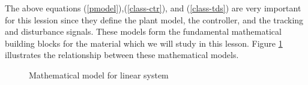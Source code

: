 \documentclass[a4paper]{article}
\theoremstyle{plain} %
{\theorembodyfont{\normalfont}
\newtheorem{Exa}{Example}}
\begin{document}
The above equations (\ref{pmodel}),(\ref{class-ctr}), and
(\ref{class-tds}) are very important for this lession since they
define the plant model, the controller, and the tracking and
disturbance signals. These models form the fundamental
mathematical building blocks for the material which we will study
in this lesson. Figure \ref{model-ls} illustrates the
relationship between these mathematical models.

\begin{figure}[h]
\caption{Mathematical model for linear system} %
\label{model-ls}
\end{figure}
\end{document}
